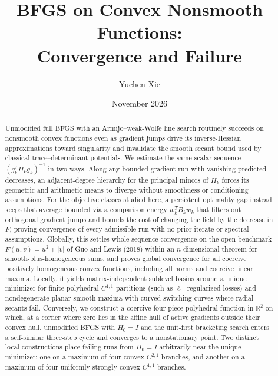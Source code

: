 \documentclass[smallextended]{svjour3}
\title{BFGS on Convex Nonsmooth Functions:\\Convergence and Failure}
\author{Yuchen Xie}
\institute{Yuchen Xie \at \email{\href{mailto:yxie@u.northwestern.edu}{yxie@u.northwestern.edu}}}
\date{November 2026}
\newcommand{\R}{\mathbb R}
\begin{document}
\maketitle
\begin{abstract}
Unmodified full BFGS with an Armijo--weak-Wolfe line search routinely succeeds
on nonsmooth convex functions even as gradient jumps drive its inverse-Hessian
approximations toward singularity and invalidate the smooth secant bound used by
classical trace--determinant potentials. We estimate the same scalar sequence
$(g_k^TH_kg_k)^{-1}$ in two ways. Along any bounded-gradient run with vanishing
predicted decreases, an adjacent-degree hierarchy for the principal minors of
$H_k$ forces its geometric and arithmetic means to diverge without smoothness or
conditioning assumptions. For the objective classes studied here, a persistent
optimality gap instead keeps that average bounded via a comparison energy
$w_k^TB_kw_k$ that filters out orthogonal gradient jumps and bounds the cost of
changing the field by the decrease in $F$, proving convergence of every
admissible run with no prior iterate or spectral assumptions. Globally, this
settles whole-sequence convergence on the open benchmark $F(u,v)=u^2+|v|$ of Guo
and Lewis (2018) within an $n$-dimensional theorem for smooth-plus-homogeneous
sums, and proves global convergence for all coercive positively homogeneous
convex functions, including all norms and coercive linear maxima. Locally, it yields matrix-independent sublevel basins around a unique minimizer
for finite polyhedral $C^{1,1}$ partitions (such as $\ell_1$-regularized losses)
and nondegenerate planar smooth maxima with curved switching curves where radial
secants fail. Conversely, we
construct a coercive four-piece polyhedral function in $\R^2$ on which, at a
corner where zero lies in the affine hull of active gradients outside their
convex hull, unmodified BFGS with $H_0=I$ and the unit-first bracketing search
enters a self-similar three-step cycle and converges to a nonstationary point.
Two distinct local constructions place failing runs from $H_0=I$ arbitrarily
near the unique minimizer: one on a maximum of four convex $C^{2,1}$ branches,
and another on a maximum of four uniformly strongly convex $C^{1,1}$ branches.
\end{abstract}






\appendix
\normalsize






\end{document}
